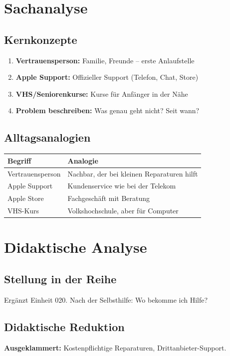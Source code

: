 \documentclass[11pt,a4paper]{article}
\begin{document}
\section{Sachanalyse}

\subsection{Kernkonzepte}
\begin{enumerate}
    \item \textbf{Vertrauensperson:} Familie, Freunde -- erste Anlaufstelle
    \item \textbf{Apple Support:} Offizieller Support (Telefon, Chat, Store)
    \item \textbf{VHS/Seniorenkurse:} Kurse für Anfänger in der Nähe
    \item \textbf{Problem beschreiben:} Was genau geht nicht? Seit wann?
\end{enumerate}

\subsection{Alltagsanalogien}
\begin{tabular}{|l|p{8cm}|}
\hline
\textbf{Begriff} & \textbf{Analogie} \\
\hline
Vertrauensperson & Nachbar, der bei kleinen Reparaturen hilft \\
Apple Support & Kundenservice wie bei der Telekom \\
Apple Store & Fachgeschäft mit Beratung \\
VHS-Kurs & Volkshochschule, aber für Computer \\
\hline
\end{tabular}

\section{Didaktische Analyse}

\subsection{Stellung in der Reihe}
Ergänzt Einheit 020. Nach der Selbsthilfe: Wo bekomme ich Hilfe?

\subsection{Didaktische Reduktion}
\textbf{Ausgeklammert:} Kostenpflichtige Reparaturen, Drittanbieter-Support.
\end{document}
